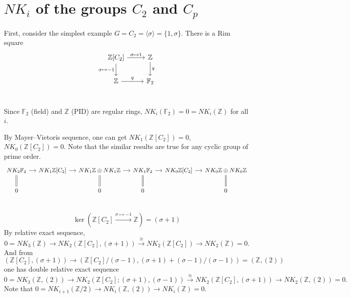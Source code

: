 \section{\texorpdfstring{$NK_i$}{NKi} of the groups \texorpdfstring{$C_2$ and $C_p$}{C2 and Cp}}
\label{sec:C2Cp}
First, consider the simplest example $G=C_2=\langle \sigma \rangle=\{1,\sigma\}$. There is a Rim square
\begin{equation}
\label{rimsqC2}
	\begin{tikzcd}
		\mathbb{Z}[C_2] \ar[r,"\sigma\mapsto 1"] \ar[d,"\sigma\mapsto -1"']& \mathbb{Z}\ar[d,"q"]\\
		 \mathbb{Z}\ar[r,"q"] & \mathbb{F}_2\\
	\end{tikzcd}
\end{equation}
	
Since $\mathbb{F}_2$ (field) and $\mathbb{Z}$ (PID) are regular rings, $NK_i(\mathbb{F}_2)=0=NK_i(\mathbb{Z})$ for all $i$.

By Mayer–Vietoris sequence, one can get $NK_1(\mathbb{Z}[C_2])=0$, $NK_0(\mathbb{Z}[C_2])=0$. Note that the similar results are true for any cyclic group of prime order.
	\[\begin{tikzcd}[column sep=small]
		NK_2 \mathbb{F}_2 \ar[r] \ar[d,equal]& NK_1 \mathbb{Z}[C_2] \ar[r] & NK_1 \mathbb{Z} \oplus NK_1 \mathbb{Z} \ar[r] \ar[d,equal]& NK_1 \mathbb{F}_2 \ar[r] \ar[d,equal] & NK_0 \mathbb{Z}[C_2] \ar[r]&NK_0 \mathbb{Z} \oplus NK_0 \mathbb{Z}  \ar[d,equal] \\
		0 & & 0 &0 & & 0\\
	\end{tikzcd}\]

\[\ker(\mathbb{Z}[C_2]\overset{\sigma \mapsto -1}\longrightarrow \mathbb{Z}) =(\sigma +1)\]
By relative exact sequence,
\[0=NK_3(\mathbb{Z})\longrightarrow NK_2(\mathbb{Z}[C_2],(\sigma+1))\overset{\cong}\longrightarrow NK_2(\mathbb{Z}[C_2])\longrightarrow NK_2(\mathbb{Z})=0.\]
And from $(\mathbb{Z}[C_2],(\sigma+1))\longrightarrow (\mathbb{Z}[C_2]/(\sigma-1),(\sigma+1)+(\sigma-1)/(\sigma-1))=(\mathbb{Z},(2))$ one has double relative exact sequence
\[0=NK_3(\mathbb{Z},(2))\longrightarrow NK_2(\mathbb{Z}[C_2];(\sigma+1),(\sigma-1))\overset{\cong}\longrightarrow NK_2(\mathbb{Z}[C_2],(\sigma+1))\longrightarrow NK_2(\mathbb{Z},(2))=0.\]
Note that $0=NK_{i+1}(\mathbb{Z}/2)\longrightarrow NK_i(\mathbb{Z},(2))\longrightarrow NK_i(\mathbb{Z})=0$.

